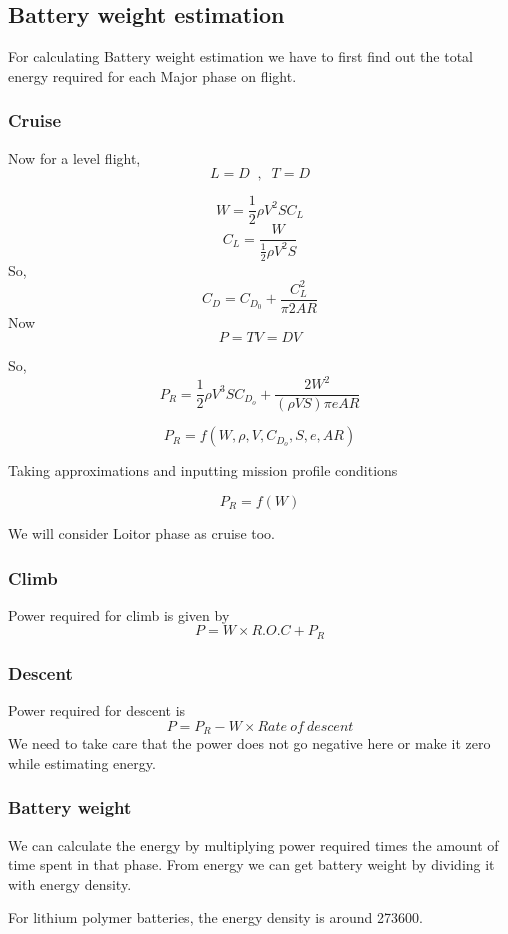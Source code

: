 \documentclass[12 pt]{article}
\begin{document}
\newpage

\subsection{Battery weight estimation}

For calculating Battery weight estimation we have to first find out the total energy required for each Major phase on flight.

\subsubsection{Cruise}
Now for a level flight,
$$ L = D \; \; , \; \; T = D$$

$$ W = \frac{1}{2} \rho V^2 S C_L $$
$$ C_L = \frac{W}{\frac{1}{2} \rho V^2 S}$$
So,
$$ C_D = C_{D_0} + \frac{C_L^2}{\pi 2 AR} $$
Now 
$$ P = TV = DV $$

So, 
$$ P_R = \frac{1}{2}\rho V^3 S C_{D_o} + \frac{2 W^2}{ (\rho V S) \pi e AR} $$

$$P_R = f(W,\rho,V,C_{D_o},S,e,AR)$$

Taking approximations and inputting mission profile conditions

$$ P_R = f(W) $$

We will consider Loitor phase as cruise too.

\subsubsection{Climb }
Power required for climb is given by 
$$ P = W \times R.O.C + P_R $$

\subsubsection{Descent}
Power required for descent is 
$$ P = P_R - W \times Rate\: of\: descent$$
We need to take care that the power does not go negative here or make it zero while estimating energy.

\subsubsection{Battery weight}

We can calculate the energy by multiplying power required times the amount of time spent in that phase. From energy we can get battery weight by dividing it with energy density. 

For lithium polymer batteries, the energy density is around 273600.
\end{document}
